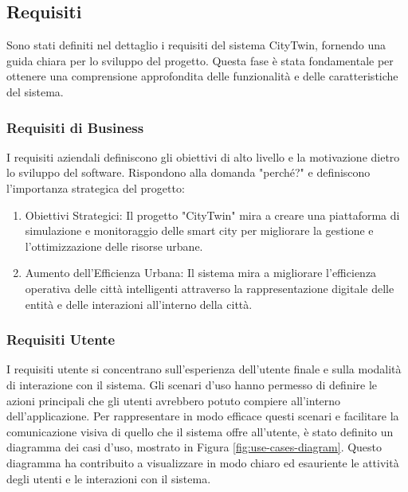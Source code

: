 \subsection{Requisiti}

Sono stati definiti nel dettaglio i requisiti del sistema CityTwin, fornendo una guida chiara per lo sviluppo del progetto. Questa fase è stata fondamentale per ottenere una comprensione approfondita delle funzionalità e delle caratteristiche del sistema.

\subsubsection{Requisiti di Business}
I requisiti aziendali definiscono gli obiettivi di alto livello e la motivazione dietro lo sviluppo del software. Rispondono alla domanda "perché?" e definiscono l'importanza strategica del progetto:
\begin{enumerate}
    \item Obiettivi Strategici: Il progetto "CityTwin" mira a creare una piattaforma di simulazione e monitoraggio delle smart city per migliorare la gestione e l'ottimizzazione delle risorse urbane.
    \item Aumento dell'Efficienza Urbana: Il sistema mira a migliorare l'efficienza operativa delle città intelligenti attraverso la rappresentazione digitale delle entità e delle interazioni all'interno della città.
\end{enumerate}

\subsubsection{Requisiti Utente}
I requisiti utente si concentrano sull'esperienza dell'utente finale e sulla modalità di interazione con il sistema.
Gli scenari d'uso hanno permesso di definire le azioni principali che gli utenti avrebbero potuto compiere all'interno dell'applicazione.
Per rappresentare in modo efficace questi scenari e facilitare la comunicazione visiva di quello che il sistema offre all'utente, è stato definito un diagramma dei casi d'uso, mostrato in Figura \ref{fig:use-cases-diagram}. Questo diagramma ha contribuito a visualizzare in modo chiaro ed esauriente le attività degli utenti e le interazioni con il sistema.

